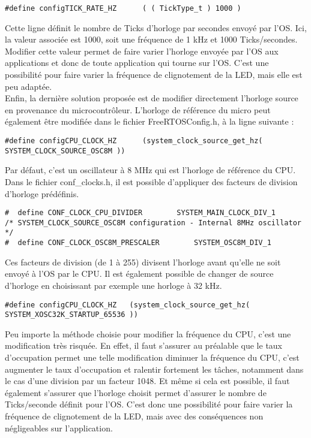 \begin{lstlisting}[style=CStyle]
#define configTICK_RATE_HZ		( ( TickType_t ) 1000 )
\end{lstlisting}

Cette ligne définit le nombre de Ticks d'horloge par secondes envoyé par l'OS.
Ici, la valeur associée est 1000, soit une fréquence de 1 kHz et 1000 Ticks/secondes.
Modifier cette valeur permet de faire varier l'horloge envoyée par l'OS aux applications et donc de toute application qui tourne sur l'OS.
C'est une possibilité pour faire varier la fréquence de clignotement de la LED, mais elle est peu adaptée.\\
Enfin, la dernière solution proposée est de modifier directement l'horloge source en provenance du microcontrôleur.
L'horloge de référence du micro peut également être modifiée dans le fichier FreeRTOSConfig.h, à la ligne suivante :

\begin{lstlisting}[style=CStyle]
#define configCPU_CLOCK_HZ		(system_clock_source_get_hz( SYSTEM_CLOCK_SOURCE_OSC8M ))
\end{lstlisting}

Par défaut, c'est un oscillateur à 8 MHz qui est l'horloge de référence du CPU.
Dans le fichier conf\_clocks.h, il est possible d'appliquer des facteurs de division d'horloge prédéfinis.

\begin{lstlisting}[style=CStyle]
#  define CONF_CLOCK_CPU_DIVIDER		SYSTEM_MAIN_CLOCK_DIV_1
/* SYSTEM_CLOCK_SOURCE_OSC8M configuration - Internal 8MHz oscillator */
#  define CONF_CLOCK_OSC8M_PRESCALER		SYSTEM_OSC8M_DIV_1
\end{lstlisting}

Ces facteurs de division (de 1 à 255) divisent l'horloge avant qu'elle ne soit envoyé à l'OS par le CPU.
Il est également possible de changer de source d'horloge en choisissant par exemple une horloge à 32 kHz.

\begin{lstlisting}[style=CStyle]
#define configCPU_CLOCK_HZ	 (system_clock_source_get_hz( SYSTEM_XOSC32K_STARTUP_65536 ))
\end{lstlisting}

Peu importe la méthode choisie pour modifier la fréquence du CPU, c'est une modification très risquée.
En effet, il faut s'assurer au préalable que le taux d'occupation permet une telle modification  diminuer la fréquence du CPU, c'est augmenter le taux d'occupation et ralentir fortement les tâches, notamment dans le cas d'une division par un facteur 1048.
Et même si cela est possible, il faut également s'assurer que l'horloge choisit permet d'assurer le nombre de Ticks/seconde définit pour l'OS.
C'est donc une possibilité pour faire varier la fréquence de clignotement de la LED, mais avec des conséquences non négligeables sur l'application.